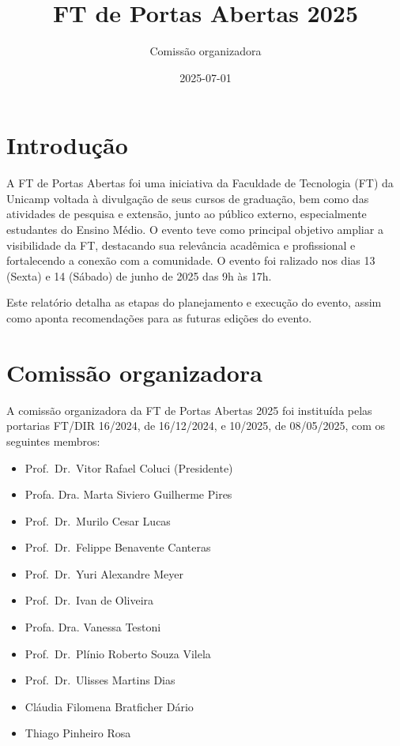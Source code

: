\documentclass[
  letterpaper,
  DIV=11,
  numbers=noendperiod]{scrreprt}
\title{FT de Portas Abertas 2025}
\author{Comissão organizadora}
\date{2025-07-01}
\renewcommand*\contentsname{Table of contents}
\newcommand\contentsname{Table of contents}
\begin{document}
\maketitle

\renewcommand*\contentsname{Table of contents}
{
\hypersetup{linkcolor=}
\setcounter{tocdepth}{2}
\tableofcontents
}


\chapter{Introdução}\label{introduuxe7uxe3o}

A FT de Portas Abertas foi uma iniciativa da Faculdade de Tecnologia
(FT) da Unicamp voltada à divulgação de seus cursos de graduação, bem
como das atividades de pesquisa e extensão, junto ao público externo,
especialmente estudantes do Ensino Médio. O evento teve como principal
objetivo ampliar a visibilidade da FT, destacando sua relevância
acadêmica e profissional e fortalecendo a conexão com a comunidade. O
evento foi ralizado nos dias 13 (Sexta) e 14 (Sábado) de junho de 2025
das 9h às 17h.

Este relatório detalha as etapas do planejamento e execução do evento,
assim como aponta recomendações para as futuras edições do evento.


\chapter{Comissão organizadora}\label{comissuxe3o-organizadora}

A comissão organizadora da FT de Portas Abertas 2025 foi instituída
pelas portarias FT/DIR 16/2024, de 16/12/2024, e 10/2025, de 08/05/2025,
com os seguintes membros:

\begin{itemize}
\item
  Prof.~Dr.~Vitor Rafael Coluci (Presidente)
\item
  Profa. Dra. Marta Siviero Guilherme Pires
\item
  Prof.~Dr.~Murilo Cesar Lucas
\item
  Prof.~Dr.~Felippe Benavente Canteras
\item
  Prof.~Dr.~Yuri Alexandre Meyer
\item
  Prof.~Dr.~Ivan de Oliveira
\item
  Profa. Dra. Vanessa Testoni
\item
  Prof.~Dr.~Plínio Roberto Souza Vilela
\item
  Prof.~Dr.~Ulisses Martins Dias
\item
  Cláudia Filomena Bratficher Dário
\item
  Thiago Pinheiro Rosa
\end{itemize}
\end{document}

